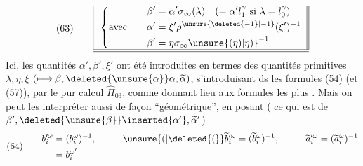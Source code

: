 \[
(63)\qquad
\begin{array}{||l||}
\left\{\begin{aligned}
\beta'&=\alpha'\sigma_\infty(\lambda)\quad(=\alpha'l_1^\gamma\text{ si }\lambda=l_0^\gamma)\\
\text{avec}\qquad\alpha'&=\xi'\rho^{\unsure{\deleted{-1}|-1}}(\xi')^{-1}\\
\beta'&=\eta\sigma_\infty\unsure{(\eta)|\eta)}^{-1}
\end{aligned}\right.\\\hline\hline
\end{array}
\]
Ici, les quantités $\alpha',\beta',\xi'$ ont été introduites en termes des quantités primitives
$\lambda,\eta,\xi$ $(\longmapsto\beta,\deleted{\unsure{\alpha}}\alpha,\widetilde\alpha)$,
s'introduisant ds les formules (54) (et (57)), par le pur calcul  
$\widehat\Pi_{03}$, comme donnant lieu aux formules les plus .
Mais on peut les interpréter aussi de façon ``géométrique'', en posant
(  ce qui est de $\beta',\deleted{\unsure{\beta}}\inserted{\alpha'},\widetilde\alpha'$)
\[
(64)\qquad
\begin{aligned}
b_i^{\prime\omega}&=(b_i^\omega)^{-1},\qquad&
\unsure{(|\deleted{(}}\widetilde b_i^{\prime\omega}&=(\widetilde b_i^\omega)^{-1},\qquad&
\widetilde a_i^{\prime\omega}&=(\widetilde a_i^\omega)^{-1}\\
&=b_i^{\omega'}&&&&
\end{aligned}
\]
